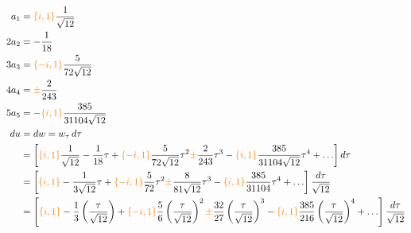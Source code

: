 \documentclass{article}
\begin{document}
\begin{align*}
a_1 & = \textcolor{orange}{\{i, 1\}}\frac{1}{\sqrt{12}} \\
2 a_2 & = -\frac{1}{18} \\
3 a_3 & = \textcolor{orange}{\{-i, 1\}}\frac{5}{72\sqrt{12}} \\
4 a_4 & = \textcolor{orange}{\pm}\frac{2}{243} \\
5 a_5 & = -\textcolor{orange}{\{i, 1\}}\frac{385}{31104\sqrt{12}} \\
du & = dw = w_\tau\,d\tau \\
& = \left[ \textcolor{orange}{\{i, 1\}}\frac{1}{\sqrt{12}} - \frac{1}{18} \tau + \textcolor{orange}{\{-i, 1\}}\frac{5}{72\sqrt{12}} \tau^2 \textcolor{orange}{\pm} \frac{2}{243} \tau^3 - \textcolor{orange}{\{i, 1\}}\frac{385}{31104\sqrt{12}} \tau^4 + \ldots \right] d\tau \\
& = \left[ \textcolor{orange}{\{i, 1\}} - \frac{1}{3\sqrt{12}} \tau + \textcolor{orange}{\{-i, 1\}}\frac{5}{72} \tau^2 \textcolor{orange}{\pm} \frac{8}{81\sqrt{12}} \tau^3 - \textcolor{orange}{\{i, 1\}}\frac{385}{31104} \tau^4 + \ldots \right] \frac{d\tau}{\sqrt{12}} \\
& = \left[ \textcolor{orange}{\{i, 1\}} - \frac{1}{3} \left(\frac{\tau}{\sqrt{12}}\right) + \textcolor{orange}{\{-i, 1\}}\frac{5}{6} \left(\frac{\tau}{\sqrt{12}}\right)^2 \textcolor{orange}{\pm} \frac{32}{27} \left(\frac{\tau}{\sqrt{12}}\right)^3 - \textcolor{orange}{\{i, 1\}}\frac{385}{216} \left(\frac{\tau}{\sqrt{12}}\right)^4 + \ldots \right] \frac{d\tau}{\sqrt{12}} \\
\end{align*}
\color{black}
\end{document}
